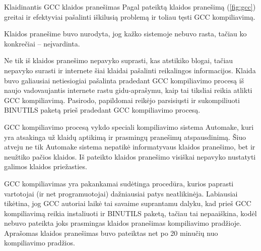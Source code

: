 \begin{xcase}{Klaidinantis GCC klaidos pranešimas}
  \xcgoal
  {
    Pagal pateiktą klaidos pranešimą (\ref{fig:gcc}) greitai ir efektyviai pašalinti iškilusią problemą ir
    toliau tęsti GCC kompiliavimą.
  }
  
  \xctools
  {
    Klaidos pranešime buvo nurodyta, jog kažko sistemoje nebuvo rasta, tačiau ko konkrečiai – 
    neįvardinta.
  }
  
  \xcresult
  {
    Ne tik iš klaidos pranešimo nepavyko suprasti, kas atstikiko blogai, tačiau nepavyko 
    surasti ir internete šiai klaidai pašalinti reikalingos informacijos.
    Klaida buvo galiausiai netiesiogiai pašalinta pradedant GCC kompiliavimo procesą iš naujo
    vadovaujantis internete rastu gidu-aprašymu, kaip tai tiksliai reikia atlikti GCC kompiliavimą. 
    Pasirodo, papildomai reikėjo parsisiųsti ir sukompiliuoti BINUTILS paketą prieš pradedant GCC 
    kompiliavimo procesą.
  }
  
  \xcprinciples
  {
    {
      GCC kompiliavimo procesą vykdo speciali kompiliavimo sistema Automake, kuri yra atsakinga
      už klaidų aptikimą ir prasmingų pranešimų atspausdinimą. Šiuo atveju ne tik Automake 
      sistema nepatikė informatyvaus klaidos pranešimo, bet ir neužtiko pačios klaidos.
    }
    {
      Iš pateikto klaidos pranešimo visiškai nepavyko nustatyti galimos klaidos priežasties.
    }
  }
  
  \xcthoughts
  {
    GCC kompiliavimas yra pakankamai sudėtinga procedūra, kurios paprasti vartotojai 
    (ir net programuotojai) dažniausiai patys neatlikinėja. Labiausiai tikėtina, jog GCC
    autoriai laikė tai savaime suprantamu dalyku, kad prieš GCC kompiliavimą reikia instaliuoti
    ir BINUTILS paketą, tačiau tai nepaaiškina, kodėl nebuvo pateikta joks prasmingas klaidos
    pranešimas kompiliavimo pradžioje. Aprašomas klaidos pranešimas buvo pateiktas net po 20 minučių
    nuo kompiliavimo pradžios.
  }
\end{xcase}
